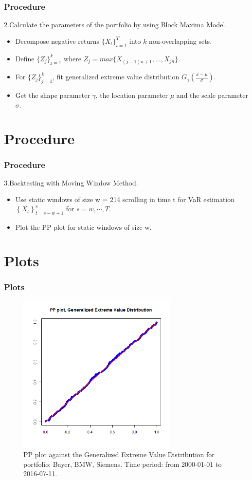 \documentclass[12pt]{beamer}
\begin{document}
\begin{frame}
	\frametitle{Procedure}
        2.Calculate the parameters of the portfolio by using Block Maxima Model.
	\begin{itemize}
		\item Decompose negative returns $\{X_t\}_{t=1}^T$ into $k$ non-overlapping sets.
		\item Define $\{Z_j\}_{j=1}^k$ where $Z_j=max\{X_{(j-1)n+1},...,X_{jn}\}$.
		\item For $\{Z_j\}_{j=1}^k$, fit generalized extreme value distribution $G_{\gamma}(\frac{x-\mu}{\sigma})$.
        \item Get the shape parameter $\gamma$, the location parameter $\mu$ and the scale parameter $\sigma$.
	\end{itemize}
\end{frame}


\section{Procedure}

\begin{frame}
	\frametitle{Procedure}
        3.Backtesting with Moving Window Method.
	\begin{itemize}
		\item Use static windows of size w = 214 scrolling in time t for VaR estimation $\left \{ X_t 
             \right\}_{t=s-w+1}^{s}$ for $s = w,\cdots ,T$.
        \item Plot the PP plot for static windows of size w.
	\end{itemize}
\end{frame}



\section{Plots}
\begin{frame}
\frametitle{Plots}
\begin{figure}
  \centering
  \includegraphics[width=8cm]{SFMTailGEV}
  \caption{PP plot against the Generalized Extreme Value Distribution for portfolio: Bayer, BMW, Siemens. Time period: from 2000-01-01 to 2016-07-11.}
\end{figure}

\end{frame}


	
	
\end{document}
